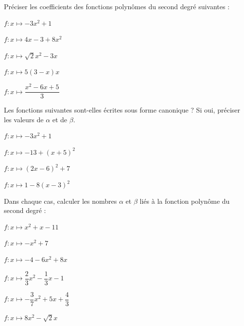 \documentclass[a4paper,french]{article}
\begin{document}
	\graphicspath{{images/}}
	
	\begin{center}
		
		
	\end{center}



Préciser les coefficients des fonctions polynômes du second degré suivantes :


	\begin{enumMet}
		\item $f: x \mapsto-3 x^2+1$
		\item $f: x \mapsto 4 x-3+8 x^2$
		\item $f: x \mapsto \sqrt{2} x^2-3 x$
		\item $f: x \mapsto 5(3-x) x$
		\item $f: x \mapsto \dfrac{x^2-6 x+5}{3}$
	\end{enumMet}




Les fonctions suivantes sont-elles écrites sous forme canonique ? Si oui, préciser les valeurs de $\alpha$ et de $\beta$.
	\begin{enumMet}
		\item $f: x \mapsto-3 x^2+1$
		\item $f: x \mapsto-13+(x+5)^2$
		\item $f: x \mapsto(2 x-6)^2+7$
		\item $f: x \mapsto 1-8(x-3)^2$
	\end{enumMet}


Dans chaque cas, calculer les nombres $\alpha$ et $\beta$ liés à la fonction polynôme du second degré :
	\begin{enumMet}
		\item $f: x \mapsto x^2+x-11$
		\item $f: x \mapsto-x^2+7$
		\item $f: x \mapsto-4-6 x^2+8 x$
		\item $f: x \mapsto \dfrac{2}{3} x^2-\dfrac{1}{3} x-1$
		\item $f: x \mapsto-\dfrac{3}{7} x^2+5 x+\dfrac{4}{3}$
		\item $f: x \mapsto 8 x^2-\sqrt{2}x$
	\end{enumMet}
\end{document}
